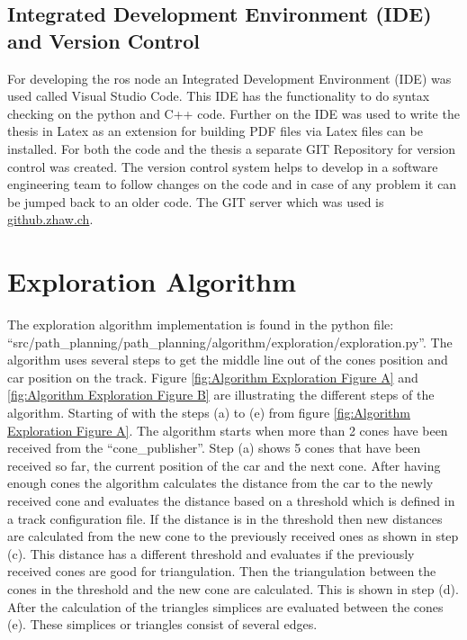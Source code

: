\subsection{Integrated Development Environment (IDE) and Version Control} \label{sec:Integrated Development Environment (IDE) and Version Control}
For developing the \acrshort{ros} node an Integrated Development Environment (IDE) was used called Visual Studio Code. This IDE has the functionality to do syntax checking on the python and C++ code. Further on the IDE was used to write the thesis in Latex as an extension for building PDF files via Latex files can be installed. For both the code and the thesis a separate GIT Repository for version control was created. The version control system helps to develop in a software engineering team to follow changes on the code and in case of any problem it can be jumped back to an older code. The GIT server which was used is \href{https://github.zhaw.ch}{github.zhaw.ch}.

\section{Exploration Algorithm} \label{sec:Exploration Algorithm}
The exploration algorithm implementation is found in the python file: ``src/path\_planning/path\_planning/algorithm/exploration/exploration.py''. The algorithm uses several steps to get the middle line out of the cones position and car position on the track. Figure \ref{fig:Algorithm Exploration Figure A} and \ref{fig:Algorithm Exploration Figure B} are illustrating the different steps of the algorithm. Starting of with the steps (a) to (e) from figure \ref{fig:Algorithm Exploration Figure A}. The algorithm starts when more than 2 cones have been received from the ``cone\_publisher''. Step (a) shows 5 cones that have been received so far, the current position of the car and the next cone. After having enough cones the algorithm calculates the distance from the car to the newly received cone and evaluates the distance based on a threshold which is defined in a track configuration file. If the distance is in the threshold then new distances are calculated from the new cone to the previously received ones as shown in step (c). This distance has a different threshold and evaluates if the previously received cones are good for triangulation. Then the triangulation between the cones in the threshold and the new cone are calculated. This is shown in step (d). After the calculation of the triangles simplices are evaluated between the cones (e). These simplices or triangles consist of several edges.


